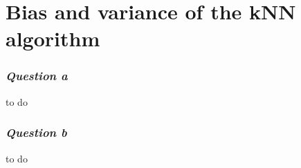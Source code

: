 \section{Bias and variance of the kNN algorithm}

\subsubsection{{\it Question a}}
to do

\subsubsection{{\it Question b}}
to do
